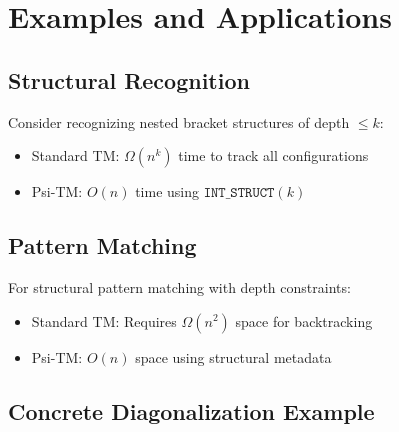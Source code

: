 \documentclass[11pt]{article}
\begin{document}
\section{Examples and Applications}

\subsection{Structural Recognition}

\begin{example}
Consider recognizing nested bracket structures of depth $\leq k$:
\begin{itemize}
\item Standard TM: $\Omega(n^k)$ time to track all configurations
\item Psi-TM: $O(n)$ time using $\texttt{INT\_STRUCT}(k)$
\end{itemize}
\end{example}

\subsection{Pattern Matching}

\begin{example}
For structural pattern matching with depth constraints:
\begin{itemize}
\item Standard TM: Requires $\Omega(n^2)$ space for backtracking
\item Psi-TM: $O(n)$ space using structural metadata
\end{itemize}
\end{example}

\subsection{Concrete Diagonalization Example}
\end{document}
